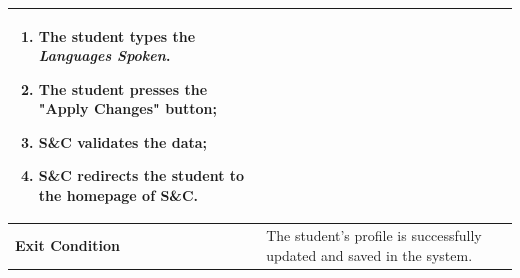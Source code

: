 \begin{enumerate}[label=\textbf{[US\arabic*]}, left = 0pt, align = left, resume]
\begin{longtable}{|l|p{11cm}|}
\begin{enumerate}[label=\arabic*., itemsep=0.2em]
                        \item The student types the \textit{Languages Spoken}.
                        \item The student presses the "Apply Changes" button;
                        \item S\&C validates the data;
                        \item S\&C redirects the student to the homepage of S\&C.
                    \end{enumerate} \\
                \hline
                
                \textbf{Exit Condition} & 
                    The student's profile is successfully updated and saved in the system. \\
                \hline
                

\end{longtable}
\end{enumerate}
